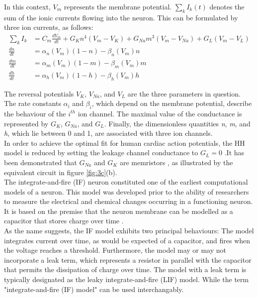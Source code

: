 \noindent In this context, $V_m$ represents the membrane potential. $\sum_{k}^{}I_k(t)$ denotes the sum of the ionic currents flowing into the neuron. This can be formulated by three ion currents, as follows:
\begin{align}
    \sum_{k}^{}I_k &= C_m \frac{dV_m}{dt} + G_Kn^4(V_m - V_K) + G_{Na}m^3(V_m - V_{Na}) + G_L (V_m - V_L) \label{eq:1.2} \\
    \frac{dn}{dt} &= \alpha_n(V_m)(1-n)-\beta_n(V_m)n \label{eq:1.3} \\
    \frac{dm}{dt} &= \alpha_m(V_m)(1-m) - \beta_m(V_m)m \label{eq:1.4} \\
    \frac{dh}{dt} &= \alpha_h(V_m)(1-h)-\beta_h(V_m)h \label{eq:1.5}
\end{align}

\noindent The reversal potentials $V_K$, $V_{Na}$, and $V_L$ are the three parameters in question. The rate constants $\alpha_i$ and $\beta_i$, which depend on the membrane potential, describe the behaviour of the $i^{th}$ ion channel. The maximal value of the conductance is represented by $G_K$, $G_{Na}$, and $G_L$. Finally, the dimensionless quantities \textit{n}, \textit{m}, and \textit{h}, which lie between 0 and 1, are associated with three ion channels. \\

\noindent In order to achieve the optimal fit for human cardiac action potentials, the HH model is reduced by setting the leakage channel conductance to $G_L = 0$  \cite{noble1962modification}.It has been demonstrated that $G_{Na}$ and $G_K$ are memristors \cite{chua1976memristive}, as illustrated by the equivalent circuit in figure \ref{fig:3c}(b). \\

\noindent The integrate-and-fire (IF) neuron \cite{lapicque1907louis} constituted one of the earliest computational models of a neuron. This model was developed prior to the ability of researchers to measure the electrical and chemical changes occurring in a functioning neuron. It is based on the premise that the neuron membrane can be modelled as a capacitor that stores charge over time \cite{abbott1999lapicque}.\\

\noindent As the name suggests, the IF model exhibits two principal behaviours: The model integrates current over time, as would be expected of a capacitor, and fires when the voltage reaches a threshold. Furthermore, the model may or may not incorporate a leak term, which represents a resistor in parallel with the capacitor that permits the dissipation of charge over time. The model with a leak term is typically designated as the leaky integrate-and-fire (LIF) model. While the term "integrate-and-fire (IF) model" can be used interchangably. \\

